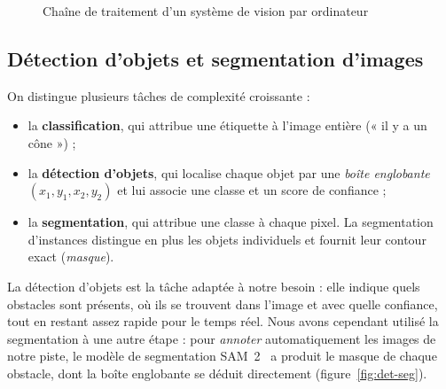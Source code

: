 \begin{figure}[H]
\centering
{}
\caption{Chaîne de traitement d'un système de vision par ordinateur}
\label{fig:chaine-vision}
\end{figure}

\subsection{Détection d'objets et segmentation d'images}
On distingue plusieurs tâches de complexité croissante :
\begin{itemize}
  \item la \textbf{classification}, qui attribue une étiquette à l'image entière (« il y a un cône ») ;
  \item la \textbf{détection d'objets}, qui localise chaque objet par une \emph{boîte englobante}
        $(x_1, y_1, x_2, y_2)$ et lui associe une classe et un score de confiance ;
  \item la \textbf{segmentation}, qui attribue une classe à chaque pixel. La segmentation d'instances distingue en
        plus les objets individuels et fournit leur contour exact (\emph{masque}).
\end{itemize}
La détection d'objets est la tâche adaptée à notre besoin : elle indique quels obstacles sont présents, où ils se
trouvent dans l'image et avec quelle confiance, tout en restant assez rapide pour le temps réel. Nous avons
cependant utilisé la segmentation à une autre étape : pour \emph{annoter} automatiquement les images de notre piste,
le modèle de segmentation SAM~2~\cite{ravi2024sam2} a produit le masque de chaque obstacle, dont la boîte englobante
se déduit directement (figure~\ref{fig:det-seg}).

